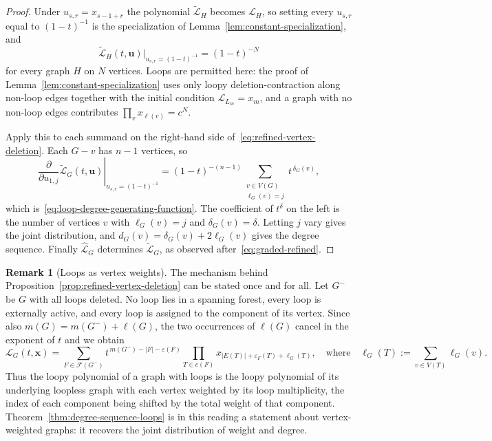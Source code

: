 \documentclass[11pt]{article}
\theoremstyle{plain}
\theoremstyle{definition}
\newtheorem{remark}[theorem]{Remark}
\renewcommand{\mathcal}{\mathscr}
\newcommand{\LL}{\mathcal{L}}    %
\newcommand{\cF}{\mathcal{F}}    %
\newcommand{\bu}{\mathbf{u}}
\newcommand{\bx}{\mathbf{x}}
\newcommand{\eps}{\varepsilon}
\numberwithin{equation}{section}
\begin{document}
\begin{proof}
Under $u_{s,r}=x_{s-1+r}$ the polynomial $\widetilde{\LL}_H$ becomes $\LL_H$,
so setting every $u_{s,r}$ equal to $(1-t)^{-1}$ is the specialization of
Lemma~\ref{lem:constant-specialization}, and
\[
   \widetilde{\LL}_H(t,\bu)\big|_{u_{s,r}=(1-t)^{-1}}=(1-t)^{-N}
\]
for every graph $H$ on $N$ vertices.  Loops are permitted here: the proof of
Lemma~\ref{lem:constant-specialization} uses only loopy deletion-contraction
along non-loop edges together with the initial condition
$\LL_{L_m}=x_m$, and a graph with no non-loop edges contributes
$\prod_{v}x_{\ell(v)}=c^{N}$.

Apply this to each summand on the right-hand side
of~\eqref{eq:refined-vertex-deletion}.  Each $G-v$ has $n-1$ vertices, so
\[
   \left.
      \frac{\partial}{\partial u_{1,j}}\widetilde{\LL}_G(t,\bu)
   \right|_{u_{s,r}=(1-t)^{-1}}
   =
   (1-t)^{-(n-1)}
   \sum_{\substack{v\in V(G)\\ \ell_G(v)=j}} t^{\,\delta_G(v)} ,
\]
which is~\eqref{eq:loop-degree-generating-function}.  The coefficient of
$t^{\delta}$ on the left is the number of vertices $v$ with $\ell_G(v)=j$ and
$\delta_G(v)=\delta$. Letting $j$ vary gives the joint distribution, and
$d_G(v)=\delta_G(v)+2\ell_G(v)$ gives the degree sequence.  Finally
$\widehat{\LL}_G$ determines $\widetilde{\LL}_G$, as observed
after~\eqref{eq:graded-refined}.
\end{proof}


\begin{remark}[Loops as vertex weights]\label{rem:loops-as-weights}
The mechanism behind Proposition~\ref{prop:refined-vertex-deletion} can be
stated once and for all.  Let $G^{-}$ be $G$ with all loops deleted.  No loop
lies in a spanning forest, every loop is externally active, and every loop is
assigned to the component of its vertex. Since also
$m(G)=m(G^{-})+\ell(G)$, the two occurrences of $\ell(G)$ cancel in the
exponent of $t$ and we obtain
\begin{equation}\label{eq:loops-as-weights}
   \LL_G(t,\bx)
   =
   \sum_{F\in\cF(G^{-})}
      t^{\,m(G^{-})-|F|-\eps(F)}
      \prod_{T\in c(F)}x_{|E(T)|+\eps_F(T)+\ell_G(T)},
   \quad \text{where} \quad
   \ell_G(T):=\sum_{v\in V(T)}\ell_G(v).
\end{equation}
Thus the loopy polynomial of a graph with loops is the loopy polynomial
of its underlying loopless graph with each vertex weighted by its loop
multiplicity, the index of each component being shifted by the total weight
of that component.  Theorem~\ref{thm:degree-sequence-loops} is in this
reading a statement about vertex-weighted graphs: it recovers the joint
distribution of weight and degree.
\end{remark}
\end{document}
